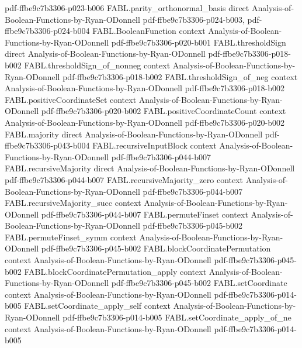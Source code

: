 \begin{theorem}
  {pdf-ffbe9c7b3306-p023-b006}
\proofstep
  {FABL.parity_orthonormal_basis}
  {direct}
  {Analysis-of-Boolean-Functions-by-Ryan-ODonnell}
  {pdf-ffbe9c7b3306-p024-b003,
    pdf-ffbe9c7b3306-p024-b004}
\proofstep
  {FABL.BooleanFunction}
  {context}
  {Analysis-of-Boolean-Functions-by-Ryan-ODonnell}
  {pdf-ffbe9c7b3306-p020-b001}
\proofstep
  {FABL.thresholdSign}
  {direct}
  {Analysis-of-Boolean-Functions-by-Ryan-ODonnell}
  {pdf-ffbe9c7b3306-p018-b002}
\proofstep
  {FABL.thresholdSign_of_nonneg}
  {context}
  {Analysis-of-Boolean-Functions-by-Ryan-ODonnell}
  {pdf-ffbe9c7b3306-p018-b002}
\proofstep
  {FABL.thresholdSign_of_neg}
  {context}
  {Analysis-of-Boolean-Functions-by-Ryan-ODonnell}
  {pdf-ffbe9c7b3306-p018-b002}
\proofstep
  {FABL.positiveCoordinateSet}
  {context}
  {Analysis-of-Boolean-Functions-by-Ryan-ODonnell}
  {pdf-ffbe9c7b3306-p020-b002}
\proofstep
  {FABL.positiveCoordinateCount}
  {context}
  {Analysis-of-Boolean-Functions-by-Ryan-ODonnell}
  {pdf-ffbe9c7b3306-p020-b002}
\proofstep
  {FABL.majority}
  {direct}
  {Analysis-of-Boolean-Functions-by-Ryan-ODonnell}
  {pdf-ffbe9c7b3306-p043-b004}
\proofstep
  {FABL.recursiveInputBlock}
  {context}
  {Analysis-of-Boolean-Functions-by-Ryan-ODonnell}
  {pdf-ffbe9c7b3306-p044-b007}
\proofstep
  {FABL.recursiveMajority}
  {direct}
  {Analysis-of-Boolean-Functions-by-Ryan-ODonnell}
  {pdf-ffbe9c7b3306-p044-b007}
\proofstep
  {FABL.recursiveMajority_zero}
  {context}
  {Analysis-of-Boolean-Functions-by-Ryan-ODonnell}
  {pdf-ffbe9c7b3306-p044-b007}
\proofstep
  {FABL.recursiveMajority_succ}
  {context}
  {Analysis-of-Boolean-Functions-by-Ryan-ODonnell}
  {pdf-ffbe9c7b3306-p044-b007}
\proofstep
  {FABL.permuteFinset}
  {context}
  {Analysis-of-Boolean-Functions-by-Ryan-ODonnell}
  {pdf-ffbe9c7b3306-p045-b002}
\proofstep
  {FABL.permuteFinset_symm}
  {context}
  {Analysis-of-Boolean-Functions-by-Ryan-ODonnell}
  {pdf-ffbe9c7b3306-p045-b002}
\proofstep
  {FABL.blockCoordinatePermutation}
  {context}
  {Analysis-of-Boolean-Functions-by-Ryan-ODonnell}
  {pdf-ffbe9c7b3306-p045-b002}
\proofstep
  {FABL.blockCoordinatePermutation_apply}
  {context}
  {Analysis-of-Boolean-Functions-by-Ryan-ODonnell}
  {pdf-ffbe9c7b3306-p045-b002}
\proofstep
  {FABL.setCoordinate}
  {context}
  {Analysis-of-Boolean-Functions-by-Ryan-ODonnell}
  {pdf-ffbe9c7b3306-p014-b005}
\proofstep
  {FABL.setCoordinate_apply_self}
  {context}
  {Analysis-of-Boolean-Functions-by-Ryan-ODonnell}
  {pdf-ffbe9c7b3306-p014-b005}
\proofstep
  {FABL.setCoordinate_apply_of_ne}
  {context}
  {Analysis-of-Boolean-Functions-by-Ryan-ODonnell}
  {pdf-ffbe9c7b3306-p014-b005}

\end{theorem}

